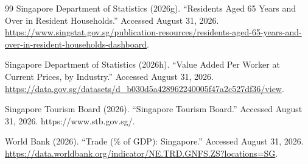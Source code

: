 \begin{thebibliography}{99}
\bibitem{} Singapore Department of Statistics (2026g). ``Residents Aged 65 Years and Over in Resident Households.'' Accessed August 31, 2026. \url{https://www.singstat.gov.sg/publication-resources/residents-aged-65-years-and-over-in-resident-households-dashboard}.

\bibitem{} Singapore Department of Statistics (2026h). ``Value Added Per Worker at Current Prices, by Industry.'' Accessed August 31, 2026. \url{https://data.gov.sg/datasets/d_b030d5a428962240005f47a2c527df36/view}.

\bibitem{} Singapore Tourism Board (2026). ``Singapore Tourism Board.'' Accessed August 31, 2026. https://www.stb.gov.sg/.

\bibitem{} World Bank (2026). ``Trade (\% of GDP): Singapore.'' Accessed August 31, 2026. \url{https://data.worldbank.org/indicator/NE.TRD.GNFS.ZS?locations=SG}.

\end{thebibliography}
